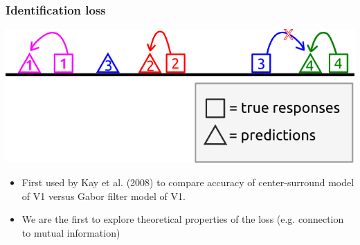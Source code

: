 \documentclass{beamer}
\begin{document}
\begin{frame}
\frametitle{Identification loss}
\begin{center}
\includegraphics[scale = 0.5]{../diagram/idloss2b.png}
\end{center}
\pause
\begin{itemize}
\item First used by Kay et al. (2008) to compare accuracy of center-surround model of V1 versus Gabor filter model of V1. \pause
\item We are the first to explore theoretical properties of the loss (e.g. connection to mutual information)
\end{itemize}
\end{frame}


\end{document}
